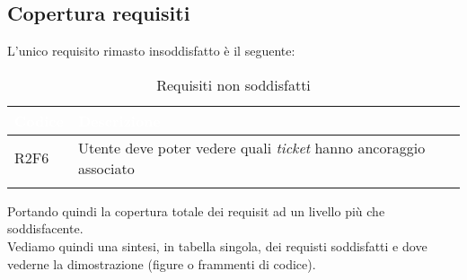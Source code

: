 \subsection{Copertura requisiti}
L'unico requisito rimasto insoddisfatto è il seguente:
{
    \setlength{\freewidth}{\dimexpr\textwidth-10\tabcolsep}
    \renewcommand{\arraystretch}{1.5}
    \centering
    \setlength{\aboverulesep}{0pt}
    \setlength{\belowrulesep}{0pt}
    \begin{longtable}{C{.15\freewidth} C{1\freewidth}} 
       \toprule
    \textcolor{white}{\textbf{Codice}}&
    \textcolor{white}{\textbf{Descrizione}}\\
    \toprule
    \endhead

    R2F6 & Utente deve poter vedere quali \textit{ticket} hanno ancoraggio associato\\

    \bottomrule
    \caption{Requisiti non soddisfatti}
    \end{longtable}
}

Portando quindi la copertura totale dei requisit ad un livello più che soddisfacente.\\
Vediamo quindi una sintesi, in tabella singola, dei requisti soddisfatti e dove vederne la dimostrazione (figure o frammenti di codice).

